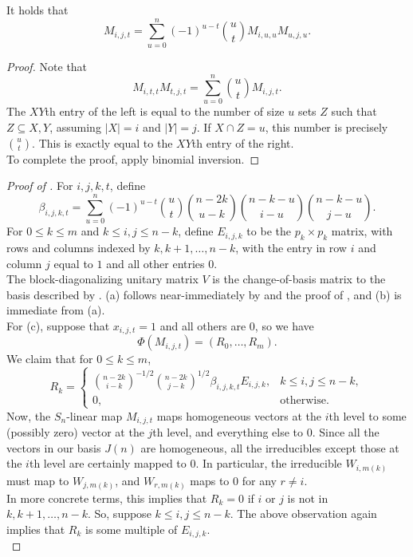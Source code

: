 	\begin{fprop}
		\label{binom-inv-2}
		It holds that
		\[ M_{i,j,t} = \sum_{u=0}^{n} (-1)^{u-t} \binom{u}{t} M_{i,u,u} M_{u,j,u}. \]
	\end{fprop}
	\begin{proof}
		Note that
		\[ M_{i,t,t} M_{t,j,t} = \sum_{u=0}^{n} \binom{u}{t} M_{i,j,t}. \]
		The $XY$th entry of the left is equal to the number of size $u$ sets $Z$ such that $Z \subseteq X,Y$, assuming $|X|=i$ and $|Y|=j$. If $X \cap Z = u$, this number is precisely $\binom{u}{t}$. This is exactly equal to the $XY$th entry of the right. \\
		To complete the proof, apply binomial inversion.
	\end{proof}

	\begin{proof}[Proof of ]
		For $i,j,k,t$, define
		\[ \beta_{i,j,k,t} = \sum_{u=0}^{n} (-1)^{u-t} \binom{u}{t} \binom{n-2k}{u-k} \binom{n-k-u}{i-u} \binom{n-k-u}{j-u}. \]
		For $0 \le k \le m$ and $k \le i,j \le n-k$, define $E_{i,j,k}$ to be the $p_k \times p_k$ matrix, with rows and columns indexed by $k,k+1,\ldots,n-k$, with the entry in row $i$ and column $j$ equal to $1$ and all other entries $0$.\\
		The block-diagonalizing unitary matrix $V$ is the change-of-basis matrix to the basis described by . (a) follows near-immediately by  and the proof of , and (b) is immediate from (a).\\
		For (c), suppose that $x_{i,j,t} = 1$ and all others are $0$, so we have
		\[ \Phi(M_{i,j,t}) = (R_0,\ldots,R_m). \]
		We claim that for $0 \le k \le m$,
		\[ R_k = \begin{cases} \binom{n-2k}{i-k}^{-1/2} \binom{n-2k}{j-k}^{1/2} \beta_{i,j,k,t} E_{i,j,k}, & k \le i,j \le n-k, \\ 0, & \text{otherwise.} \end{cases} \]
		Now, the $S_n$-linear map $M_{i,j,t}$ maps homogeneous vectors at the $i$th level to some (possibly zero) vector at the $j$th level, and everything else to $0$. Since all the vectors in our basis $J(n)$ are homogeneous, all the irreducibles except those at the $i$th level are certainly mapped to $0$. In particular, the irreducible $W_{i,m(k)}$ must map to $W_{j,m(k)}$, and $W_{r,m(k)}$ maps to $0$ for any $r \ne i$.\\
		In more concrete terms, this implies that $R_k = 0$ if $i$ or $j$ is not in $k,k+1,\ldots,n-k$. So, suppose $k \le i,j \le n-k$. The above observation again implies that $R_k$ is some multiple of $E_{i,j,k}$.\\

\end{proof}
